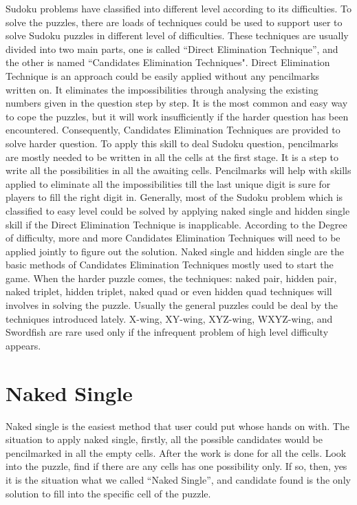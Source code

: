 \documentclass[11pt]{report}
\begin{document}
Sudoku problems have classified into different level according to its difficulties. To solve the puzzles, there are loads of techniques could be used to support user to solve Sudoku puzzles in different level of difficulties.
These techniques are usually divided into two main parts, one is called “Direct Elimination Technique”, and the other is named “Candidates Elimination Techniques".
Direct Elimination Technique is an approach could be easily applied without any pencilmarks written on. It eliminates the impossibilities through analysing the existing numbers given in the question step by step. It is the most common and easy way to cope the puzzles, but it will work insufficiently if the harder question has been encountered. 
Consequently, Candidates Elimination Techniques are provided to solve harder question. To apply this skill to deal Sudoku question, pencilmarks are mostly needed to be written in all the cells at the first stage. It is a step to write all the possibilities in all the awaiting cells. Pencilmarks will help with skills applied to eliminate all the impossibilities till the last unique digit is sure for players to fill the right digit in.
Generally, most of the Sudoku problem which is classified to easy level could be solved by applying naked single and hidden single skill if the Direct Elimination Technique is inapplicable. According to the Degree of difficulty, more and more Candidates Elimination Techniques will need to be applied jointly to figure out the solution. 
Naked single and hidden single are the basic methods of Candidates Elimination Techniques mostly used to start the game. When the harder puzzle comes, the techniques: naked pair, hidden pair, naked triplet, hidden triplet, naked quad or even hidden quad techniques will involves in solving the puzzle. Usually the general puzzles could be deal by the techniques introduced lately. X-wing, XY-wing, XYZ-wing, WXYZ-wing, and Swordfish are rare used only if the infrequent problem of high level difficulty appears. 


\section{Naked Single}
\label{sec:Naked Single}

Naked single is the easiest method that user could put whose hands on with. The situation to apply naked single, firstly, all the possible candidates would be pencilmarked in all the empty cells. After the work is done for all the cells. Look into the puzzle, find if there are any cells has one possibility only. If so, then, yes it is the situation what we called ``Naked Single'', and candidate found is the only solution to fill into the specific cell of the puzzle.
\end{document}
